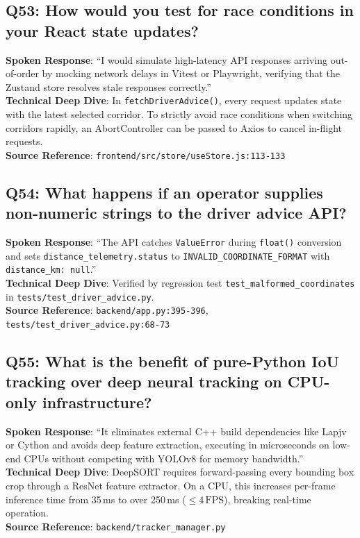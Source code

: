 \subsection*{Q53: How would you test for race conditions in your React state updates?}
\begin{interviewbox}
\textbf{Spoken Response}: ``I would simulate high-latency API responses arriving out-of-order by mocking network delays in Vitest or Playwright, verifying that the Zustand store resolves stale responses correctly.''\\
\textbf{Technical Deep Dive}: In \texttt{fetchDriverAdvice()}, every request updates state with the latest selected corridor. To strictly avoid race conditions when switching corridors rapidly, an AbortController can be passed to Axios to cancel in-flight requests.\\
\textbf{Source Reference}: \texttt{frontend/src/store/useStore.js:113-133}
\end{interviewbox}

\subsection*{Q54: What happens if an operator supplies non-numeric strings to the driver advice API?}
\begin{interviewbox}
\textbf{Spoken Response}: ``The API catches \texttt{ValueError} during \texttt{float()} conversion and sets \texttt{distance\_telemetry.status} to \texttt{INVALID\_COORDINATE\_FORMAT} with \texttt{distance\_km: null}.''\\
\textbf{Technical Deep Dive}: Verified by regression test \texttt{test\_malformed\_coordinates} in \texttt{tests/test\_driver\_advice.py}.\\
\textbf{Source Reference}: \texttt{backend/app.py:395-396}, \texttt{tests/test\_driver\_advice.py:68-73}
\end{interviewbox}

\subsection*{Q55: What is the benefit of pure-Python IoU tracking over deep neural tracking on CPU-only infrastructure?}
\begin{interviewbox}
\textbf{Spoken Response}: ``It eliminates external C++ build dependencies like Lapjv or Cython and avoids deep feature extraction, executing in microseconds on low-end CPUs without competing with YOLOv8 for memory bandwidth.''\\
\textbf{Technical Deep Dive}: DeepSORT requires forward-passing every bounding box crop through a ResNet feature extractor. On a CPU, this increases per-frame inference time from 35\,ms to over 250\,ms ($\le 4\,\text{FPS}$), breaking real-time operation.\\
\textbf{Source Reference}: \texttt{backend/tracker\_manager.py}
\end{interviewbox}


